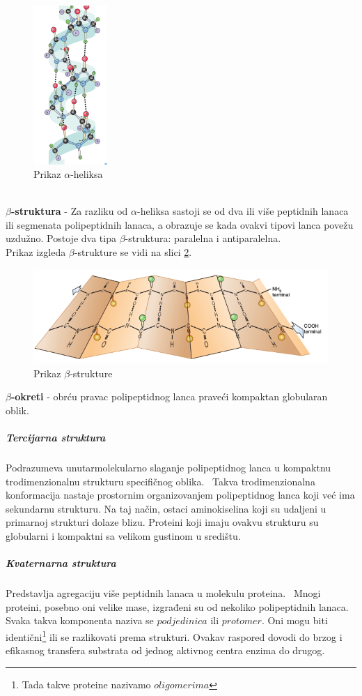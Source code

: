 \begin{figure}[h]
	\centering
    \includegraphics[width=0.25\textwidth]{Figures/BO/ahelix.png}
    \caption{Prikaz $\alpha$-heliksa~\cite{bmbg}}
    \label{fig:aheliks}
\end{figure}
 \\
\textbf{$\beta$-struktura} - Za razliku od $\alpha$-heliksa sastoji se od dva ili više peptidnih lanaca ili segmenata polipeptidnih lanaca, a obrazuje se kada ovakvi tipovi lanca povežu uzdužno. Postoje dva tipa $\beta$-struktura: paralelna i antiparalelna. ~\cite{spasic} \\
Prikaz izgleda $\beta$-strukture se vidi na slici \ref{fig:beta}.
\begin{figure}[h]
	\centering
    \includegraphics[width=1\textwidth]{Figures/BO/beta.png}
    \caption{Prikaz $\beta$-strukture~\cite{bmbg}}
    \label{fig:beta}
\end{figure}
\textbf{$\beta$-okreti} - obrću pravac polipeptidnog lanca praveći kompaktan globularan oblik.~\cite{lippincott} 
 
\subparagraph{Tercijarna struktura}
Podrazumeva unutarmolekularno slaganje polipeptidnog lanca u kompaktnu trodimenzionalnu strukturu specifičnog oblika.~\cite{medbio}
Takva trodimenzionalna konformacija nastaje prostornim organizovanjem polipeptidnog lanca koji već ima sekundarnu strukturu. Na taj način, ostaci aminokiselina koji su udaljeni u primarnoj strukturi dolaze blizu. Proteini koji imaju ovakvu strukturu su globularni i kompaktni sa velikom gustinom u središtu.~\cite{spasic}
\subparagraph{Kvaternarna struktura}
Predstavlja agregaciju više peptidnih lanaca u molekulu proteina.~\cite{medbio} Mnogi proteini, posebno oni velike mase, izgrađeni su od nekoliko polipeptidnih lanaca. Svaka takva komponenta naziva se $podjedinica$ ili $protomer$. Oni mogu biti identični\footnote{Tada takve proteine nazivamo $oligomerima$} ili se razlikovati prema strukturi. Ovakav raspored dovodi do brzog i efikasnog transfera substrata od jednog aktivnog centra enzima do drugog.~\cite{spasic}
 
